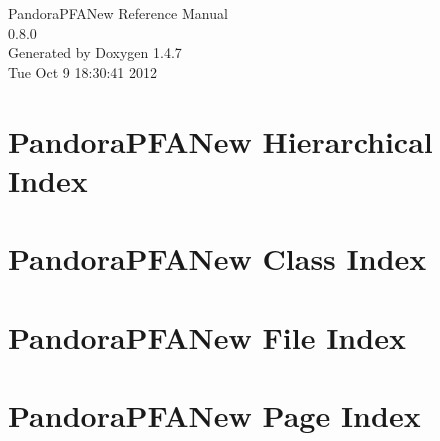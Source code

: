 \documentclass[a4paper]{book}
\begin{document}
\begin{titlepage}
\vspace*{7cm}
\begin{center}
{\Large Pandora\-PFANew Reference Manual\\[1ex]\large 0.8.0 }\\
\vspace*{1cm}
{\large Generated by Doxygen 1.4.7}\\
\vspace*{0.5cm}
{\small Tue Oct 9 18:30:41 2012}\\
\end{center}
\end{titlepage}
\clearemptydoublepage
{}
\tableofcontents
\clearemptydoublepage
{}
\chapter{Pandora\-PFANew Hierarchical Index}

\chapter{Pandora\-PFANew Class Index}

\chapter{Pandora\-PFANew File Index}

\chapter{Pandora\-PFANew Page Index}

\end{document}
